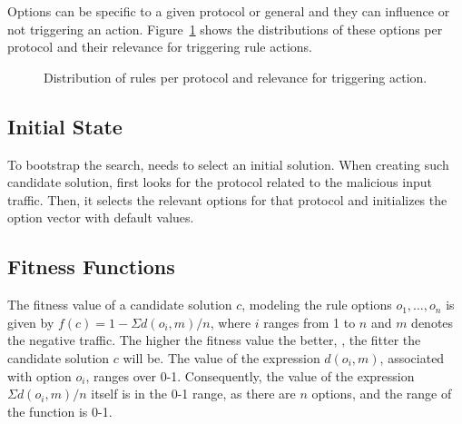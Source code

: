 \documentclass[runningheads]{llncs}
\begin{document}
Options can be specific to a given protocol or general and they can
influence or not triggering an
action. Figure~\ref{fig:distribution-rules-protocol} shows the
distributions of these options per protocol and their relevance for
triggering rule actions.

\pgfplotsset{width=5.5cm,compat=1.8}
\begin{figure}[h!]
  \centering
  \caption{\label{fig:distribution-rules-protocol}Distribution of
    rules per protocol and relevance for triggering action.}
\end{figure}

\subsection{Initial State}

To bootstrap the search, \tname{} needs to select an initial
solution. When creating such candidate solution, \tname{} first looks
for the protocol related to the malicious input traffic. Then, it
selects the relevant options for that protocol and initializes the
option vector with default values. 


\subsection{Fitness Functions}

The fitness value of a candidate solution $c$, modeling the rule
options $o_1, \dots, o_n$ is given by $f(c)=1-\Sigma{d(o_i,m)}/n$,
where $i$ ranges from 1 to $n$ and $m$ denotes the negative
traffic. The higher the fitness value the better, \ie{}, the fitter
the candidate solution $c$ will be.  The value of the expression
$d(o_i,m)$, associated with option $o_i$, ranges over
0-1. Consequently, the value of the expression $\Sigma{d(o_i,m)}/n$
itself is in the 0-1 range, as there are $n$ options, and the range of
the function is 0-1.
\end{document}
